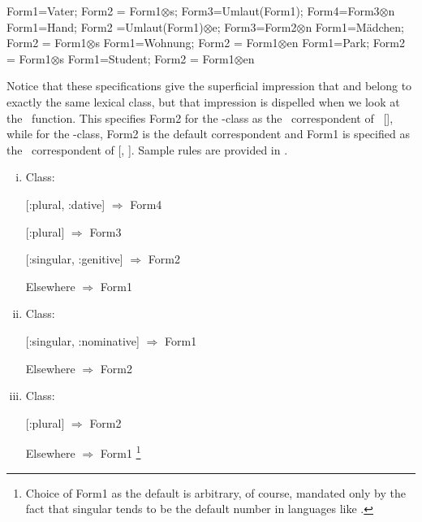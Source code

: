 \documentclass[output=paper,colorlinks,citecolor=brown]{langscibook}
\begin{document}
\ea\label{Germannouns}
\begin{xlist}
	
	\ex\label{Vater}	
	Form1=Vater; Form2 = Form1$\otimes$s; Form3=Umlaut(Form1); Form4=Form3$\otimes$n
	\ex\label{Hand}	
	Form1=Hand; Form2 =Umlaut(Form1)$\otimes$e; Form3=Form2$\otimes$n
	\ex\label{Maedchen}	
	Form1=Mädchen; Form2 = Form1$\otimes$s
	\ex\label{Wohnung}	
	Form1=Wohnung; Form2 = Form1$\otimes$en
	\ex\label{Park}	
	Form1=Park; Form2 = Form1$\otimes$s
	\ex\label{Student}	
	Form1=Student; Form2 = Form1$\otimes$en
\end{xlist}
\z
Notice that these specifications give the superficial impression that  and  belong to exactly the same lexical class, but that impression is dispelled when we look at the \Corr\ function. This specifies Form2 for the -class as  the \PF\ correspondent of \PC\ [], while for the -class, Form2 is the default correspondent and Form1 is specified as the \PF\ correspondent of [, ]. Sample rules are provided in .

\ea\label{GermanCorr}
\begin{enumerate}[(i)]
	\item		Class:
	
	[:plural, :dative]  $\Rightarrow$ Form4
	
	[:plural]  $\Rightarrow$ Form3
	
	[:singular, :genitive]  $\Rightarrow$ Form2
	
	
	Elsewhere  $\Rightarrow$ Form1
	
	\item		Class:
	
	[:singular, :nominative] $\Rightarrow$ Form1
	
	Elsewhere $\Rightarrow$ Form2
	
	\pagebreak[2]
	
	\item		Class:
	
	[:plural] $\Rightarrow$ Form2
	
	Elsewhere $\Rightarrow$ Form1%
	\footnote{Choice of Form1 as the default is arbitrary, of course, mandated only by the fact that singular tends to be the default number in languages like .}
	
\end{enumerate}		
\z
\end{document}
